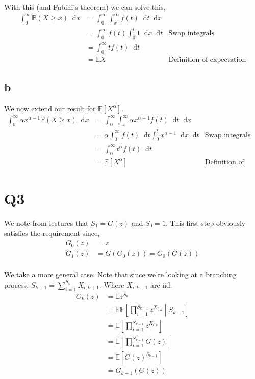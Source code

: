 \documentclass{article}
\newcommand{\diff}{\mathop{}\!\mathrm{d}}
\newcommand{\prob}{\mathbb{P}}
\newcommand{\expect}{\mathbb{E}}
\begin{document}
With this (and Fubini's theorem) we can solve this,
\begin{align*}
    \int_0^\infty \prob(X \geq x) \diff x
    &= \int_0^\infty \int_x^\infty f(t) \diff t \diff x \\
    &= \int_0^\infty f(t) \int_0^t 1 \diff x \diff t
    & \text{Swap integrals} \\
    &= \int_0^\infty t f(t) \diff t \\
    &= \expect X & \text{Definition of expectation}
\end{align*}

\subsection{b}
We now extend our result for $\expect\left[X^\alpha\right]$.
\begin{align*}
    \int_0^\infty \alpha x^{\alpha-1} \prob(X \geq x) \diff x
    &= \int_0^\infty \int_x^\infty \alpha x^{\alpha-1} f(t) \diff t \diff x \\
    &= \alpha \int_0^\infty f(t) \diff t \int_0^t x^{\alpha-1} \diff x \diff t
    & \text{Swap integrals} \\
    &= \int_0^\infty t^\alpha f(t) \diff t \\
    &= \expect \left[X^\alpha\right] & \text{Definition of expectation}
\end{align*}

\section{Q3}
We note from lectures that $S_1 = G(z)$ and $S_0 = 1$. This first step
obviously satisfies the requirement since,
\begin{align*}
    G_0(z) &= z \\
    G_1(z) &= G(G_0(z)) = G_0(G(z)) \\
\end{align*}

We take a more general case. Note that since we're looking at a branching
process, $S_{k+1} = \sum_{i=1}^{S_k} X_{i,k+1}$. Where $X_{i,k+1}$ are iid.
\begin{align*}
    G_k(z) &= \expect z^{S_k} \\
    &= \expect \expect\left[ \prod_{i=1}^{S_{k-1}} z^{X_{i,k}} \middle| S_{k-1} \right] \\
    &= \expect \left[ \prod_{i=1}^{S_{k-1}} z^{X_{i,k}} \right] \\
    &= \expect \left[ \prod_{i=1}^{S_{k-1}} G(z) \right] \\
    &= \expect \left[ G{(z)}^{S_{k-1}} \right] \\
    &= G_{k-1}\left( G(z) \right) \\
\end{align*}
\end{document}
